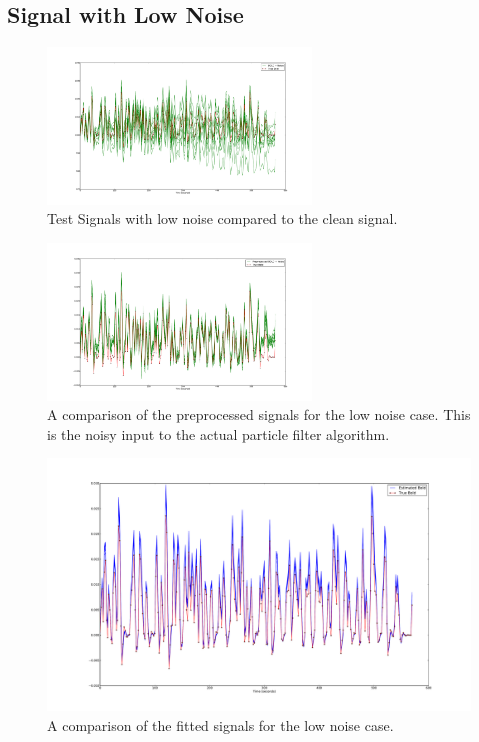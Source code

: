 \subsection{Signal with Low Noise}
\label{sec:SimLowNoise}
\begin{figure}
\includegraphics[clip=true,trim=6cm 2cm 6cm 3.5cm,width=7cm]{images/realization_lownoise}
\caption{Test Signals with low noise compared to the clean signal.}
\label{fig:LowNoiseRealization}
\end{figure}
\begin{figure}
\includegraphics[clip=true,trim=6cm 2cm 6cm 3.5cm,width=7cm]{images/preprocessed_lownoise}
\caption{A comparison of the preprocessed signals for the low noise case. This is the
noisy input to the actual particle filter algorithm.}
\label{fig:PreprocessedLowNoise}
\end{figure}
\begin{figure}
\includegraphics[clip=true,trim=6cm 2cm 6cm 3.5cm,width=17cm]{images/comparison_lownoise}
\caption{A comparison of the fitted signals for the low noise case.}
\label{fig:FitComparisonLowNoise}
\end{figure}


